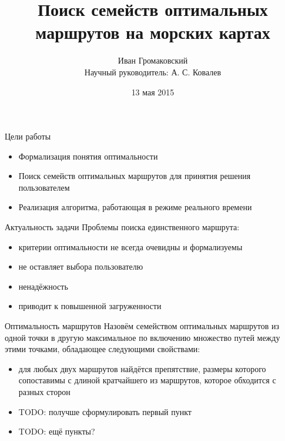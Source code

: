 \documentclass[mathserif]{beamer}
\title{Поиск семейств оптимальных маршрутов на морских картах}
\author{Иван Громаковский \\
Научный руководитель: А. С. Ковалев}
\institute{Санкт-Петербургский национальный исследовательский университет \\ информационных технологий, механики и оптики}
\date{13 мая 2015}
\begin{document}
\frame{\titlepage}

\begin{frame}{Цели работы}
    \begin{itemize}[<+->]
        \item Формализация понятия оптимальности
        \item Поиск семейств оптимальных маршрутов для принятия
          решения пользователем
        \item Реализация алгоритма, работающая в режиме реального времени
    \end{itemize}
\end{frame}

\begin{frame}{Актуальность задачи}
    Проблемы поиска единственного маршрута:
    \begin{itemize}[<+->]
        \item критерии оптимальности не всегда очевидны и формализуемы
        \item не оставляет выбора пользователю
        \item ненадёжность
        \item приводит к повышенной загруженности
    \end{itemize}
\end{frame}
        
\begin{frame}{Оптимальность маршрутов}
    Назовём семейством оптимальных маршрутов из одной точки в другую 
    максимальное по включению множество путей между этими точками,
    обладающее следующими свойствами:
    \begin{itemize}[<+->]
        \item для любых двух маршрутов найдётся препятствие, размеры
          которого сопоставимы с длиной кратчайшего из маршрутов,
          которое обходится с разных сторон
        \item TODO: получше сформулировать первый пункт
        \item TODO: ещё пункты?
    \end{itemize}
\end{frame}
\end{document}
